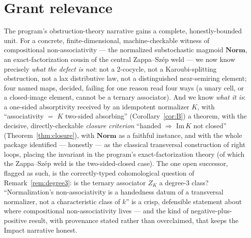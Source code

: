 \documentclass[11pt]{amsart}
\theoremstyle{plain}
\theoremstyle{definition}
\theoremstyle{remark}
\newcommand{\Norm}{\mathbf{Norm}}
\newcommand{\Img}{\mathrm{Im}\,}
\begin{document}
\section{Grant relevance}
\label{sec:grant}

The program's obstruction-theory narrative gains a complete, honestly-bounded unit. For a concrete,
finite-dimensional, machine-checkable witness of compositional non-associativity --- the normalized
substochastic magmoid $\Norm$, an exact-factorization cousin of the central Zappa--Sz\'ep weld --- we
now know precisely \emph{what the defect is not}: not a $2$-cocycle, not a Karoubi-splitting
obstruction, not a lax distributive law, not a distinguished near-semiring element; four named maps,
decided, failing for one reason read four ways (a unary cell, or a closed-image element, cannot be a
ternary associator). And we know \emph{what it is}: a one-sided absorptivity received by an idempotent
normalizer $K$, with ``associativity $=$ $K$ two-sided absorbing'' (Corollary~\ref{cor:B}) a theorem,
with the decisive, directly-checkable \emph{closure criterion} ``handed $\Rightarrow$ $\Img K$ not
closed'' (Theorem~\ref{thm:closure}), with $\Norm$ as a faithful instance, and with the whole package
identified --- honestly --- as the classical transversal construction of right loops, placing the
invariant in the program's exact-factorization theory (of which the Zappa--Sz\'ep weld is the
two-sided-closed case). The one open successor, flagged as such, is
the correctly-typed cohomological question of Remark~\ref{rem:degree3}: is the ternary associator
$Z_{K}$ a degree-$3$ class? ``Normalization's non-associativity is a handedness datum of a transversal
normalizer, not a characteristic class of $k$'' is a crisp, defensible statement about where
compositional non-associativity lives --- and the kind of negative-plus-positive result, with
provenance stated rather than overclaimed, that keeps the Impact narrative honest.
\end{document}
